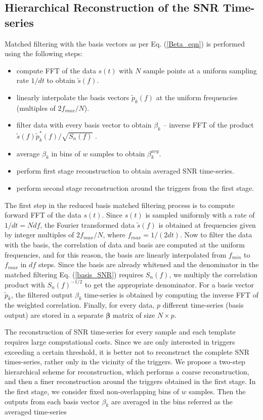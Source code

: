  
\subsection{Hierarchical Reconstruction of the SNR Time-series}\label{sec:first_stage}
Matched filtering with the basis vectors as per Eq. (\ref{Beta_eqn}) is performed using the following steps:
\begin{itemize}
    \item compute FFT of the data $s(t)$ with $N$ sample points at a uniform sampling rate $1/dt$ to obtain $\tilde{s}(f)$.
    \item linearly interpolate the basis vectors $\tilde{p}_k(f)$ at the uniform frequencies (multiples of $2f_{max}/N$).
    \item filter data with every basis vector to obtain $\beta_k$ -- inverse FFT of the product $\tilde{s}(f) \tilde{p}^*_{k}(f)/\sqrt{S_n(f)}$ .
    \item average $\beta_k$ in bins of $w$ samples to obtain $\beta^{avg}_k$.
    \item perform first stage reconstruction to obtain averaged SNR time-series.
    \item perform second stage reconstruction around the triggers from the first stage.
\end{itemize}

The first step in the reduced basis matched filtering process is to compute forward FFT of the data $s(t)$. Since $s(t)$ is sampled uniformly with a rate of $1/dt = N df$, the Fourier transformed data $\tilde{s}(f)$ is obtained at frequencies given by integer multiples of $2f_{max}/N$, where $f_{max} = 1/(2dt)$. Now to filter the data with the basis, the correlation of data and basis are computed at the uniform frequencies, and for this reason, the basis are linearly interpolated from $f_{min}$ to $f_{max}$ in $df$ steps. Since the basis are already whitened and the denominator in the matched filtering Eq. (\ref{basis_SNR}) requires $S_n(f)$, we multiply the correlation product with $S_n(f)^{-1/2}$ to get the appropriate denominator. For a basis vector $\tilde{p}_k$, the filtered output $\beta_k$ time-series is obtained by computing the inverse FFT of the weighted correlation. Finally, for every data, $p$ different time-series (basis output) are stored in a separate $\pmb{\beta}$ matrix of size $N \times p$. 

The reconstruction of SNR time-series for every sample and each template requires large computational costs. Since we are only interested in triggers exceeding a certain threshold, it is better not to reconstruct the complete SNR times-series, rather only in the vicinity of the triggers. We propose a two-step hierarchical scheme for reconstruction, which performs a coarse reconstruction, and then a finer reconstruction around the triggers obtained in the first stage. In the first stage, we consider fixed non-overlapping bins of $w$ samples. Then the outputs from each basis vector $\beta_k$ are averaged in the bins referred as the averaged time-series 

